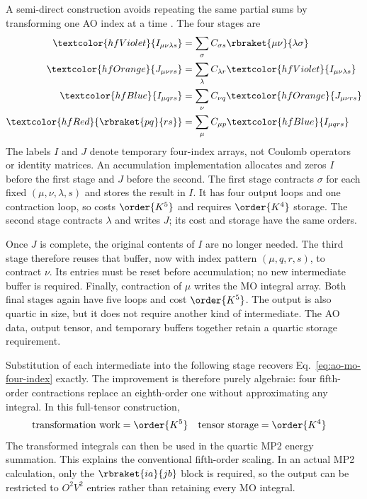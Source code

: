 \documentclass[11pt,a4paper,titlepage]{article}
\numberwithin{equation}{section}
\newcommand{\red}[1]{\textcolor{hfRed}{#1}}
\newcommand{\orange}[1]{\textcolor{hfOrange}{#1}}
\newcommand{\blue}[1]{\textcolor{hfBlue}{#1}}
\newcommand{\violet}[1]{\textcolor{hfViolet}{#1}}
\begin{document}
A semi-direct construction avoids repeating the same partial
sums by transforming one AO index at a time
\citep{FrischHeadGordonPople1990}. The four stages are
\begin{align}
  \violet{I_{\mu\nu\lambda s}}
    &=\sum_\sigma C_{\sigma s}\rbraket{\mu\nu}{\lambda\sigma}
    \label{eq:ao-mo-quarter-one}
  \\
  \orange{J_{\mu\nu rs}}
    &=\sum_\lambda C_{\lambda r}\violet{I_{\mu\nu\lambda s}}
    \label{eq:ao-mo-quarter-two}
  \\
  \blue{I_{\mu qrs}}
    &=\sum_\nu C_{\nu q}\orange{J_{\mu\nu rs}}
    \label{eq:ao-mo-quarter-three}
  \\
  \red{\rbraket{pq}{rs}}
    &=\sum_\mu C_{\mu p}\blue{I_{\mu qrs}}
    \label{eq:ao-mo-quarter-four}
\end{align}
The labels $I$ and $J$ denote temporary four-index arrays, not Coulomb
operators or identity matrices. An accumulation implementation allocates
and zeros $I$ before the first stage and $J$ before the second.
The first stage contracts $\sigma$ for
each fixed $(\mu,\nu,\lambda,s)$ and stores the result in $I$. It has
four output loops and one contraction loop, so costs $\order{K^5}$ and
requires $\order{K^4}$ storage. The second stage contracts $\lambda$ and
writes $J$; its cost and storage have the same orders.

Once $J$ is complete, the original contents of $I$ are no longer needed.
The third stage therefore reuses that buffer, now with index pattern
$(\mu,q,r,s)$, to contract $\nu$. Its entries must be reset before
accumulation; no new intermediate buffer is required. Finally, contraction
of $\mu$ writes the MO integral array. Both final stages again have five
loops and cost $\order{K^5}$. The output is also quartic in size, but it
does not require another kind of intermediate. The AO data, output tensor,
and temporary buffers together retain a quartic storage requirement.

Substitution of each intermediate into the following stage recovers
Eq.~\eqref{eq:ao-mo-four-index} exactly. The improvement is therefore
purely algebraic: four fifth-order contractions replace an eighth-order
one without approximating any integral. In this full-tensor construction,
\begin{align}
  \text{transformation work}&=\order{K^5}
  &
  \text{tensor storage}&=\order{K^4}
\end{align}
The transformed integrals can then be used in the quartic MP2 energy
summation. This explains the conventional fifth-order scaling. In an
actual MP2 calculation, only the $\rbraket{ia}{jb}$ block is required,
so the output can be restricted to $O^2V^2$ entries rather than retaining
every MO integral.
\end{document}

